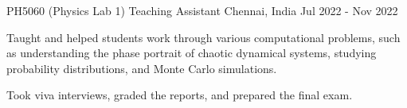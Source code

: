 

\begin{cventries}

\cventry
    {PH5060 (Physics Lab 1)} %
    {Teaching Assistant} %
    {Chennai, India} %
    {Jul 2022 - Nov 2022} %
    {
      \begin{cvitems} %
        \item {Taught and helped students work through various computational problems, such as understanding the phase portrait of chaotic dynamical systems, studying probability distributions, and Monte Carlo simulations.} \item {Took viva interviews, graded the reports, and prepared the final exam.}
      \end{cvitems}
    }


\end{cventries}

